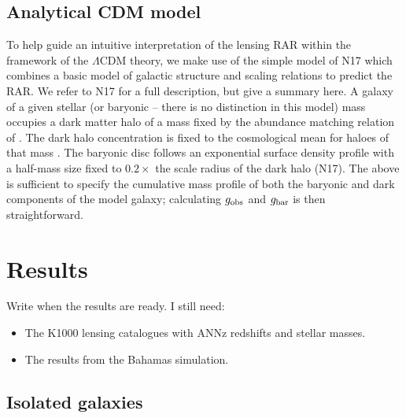 \documentclass[usenatbib]{mnras}
\begin{document}
\subsection{Analytical CDM model}
\label{sec:analytical}

To help guide an intuitive interpretation of the lensing RAR within the framework of the $\Lambda$CDM theory, we make use of the simple model of N17 which combines a basic model of galactic structure and scaling relations to predict the RAR. We refer to N17 for a full description, but give a summary here. A galaxy of a given stellar (or baryonic -- there is no distinction in this model)  mass occupies a dark matter halo of a mass fixed by the abundance matching relation of \citet{Behroozi13}. The dark halo concentration is fixed to the cosmological mean for haloes of that mass \citep{Ludlow14}. The baryonic disc follows an exponential surface density profile with a half-mass size fixed to $0.2\times$ the scale radius of the dark halo (N17). The above is sufficient to specify the cumulative mass profile of both the baryonic and dark components of the model galaxy; calculating $g_{\rm obs}$ and $g_{\rm bar}$ is then straightforward.

\section{Results}
\label{sec:results}
Write when the results are ready.
I still need:
\begin{itemize}
	\item The K1000 lensing catalogues with ANNz redshifts and stellar masses.
	\item The results from the Bahamas simulation.
\end{itemize}

\subsection{Isolated galaxies}
\end{document}

